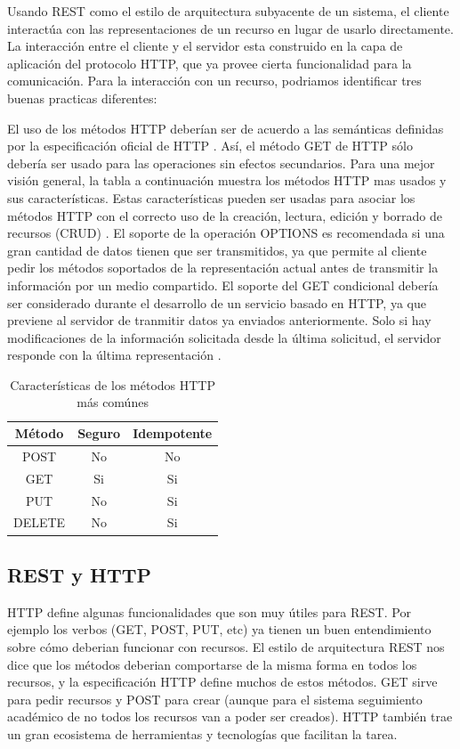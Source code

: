 Usando REST como el estilo de arquitectura subyacente de un sistema, el cliente interactúa con las representaciones de un recurso en lugar de usarlo directamente. La interacción entre el cliente y el servidor esta construido en la capa de aplicación del protocolo HTTP, que ya provee cierta funcionalidad para la comunicación. Para la interacción con un recurso, podriamos identificar tres buenas practicas diferentes:
\begin{outline}
    \1 El uso de los métodos HTTP deberían ser de acuerdo a las semánticas definidas por la especificación oficial de HTTP \cite{WAPID}. Así, el método GET de HTTP sólo debería ser usado para las operaciones sin efectos secundarios. Para una mejor visión general, la tabla a continuación muestra los métodos HTTP mas usados y sus características. Estas características pueden ser usadas para asociar los métodos HTTP con el correcto uso de la creación, lectura, edición y borrado de recursos (CRUD) \cite{RVINOSKI}.
    \1 El soporte de la operación OPTIONS es recomendada si una gran cantidad de datos tienen que ser transmitidos, ya que permite al cliente pedir los métodos soportados de la representación actual antes de transmitir la información por un medio compartido. 
    \1 El soporte del GET condicional debería ser considerado durante el desarrollo de un servicio basado en HTTP, ya que previene al servidor de tranmitir datos ya enviados anteriormente. Solo si hay modificaciones de la información solicitada desde la última solicitud, el servidor responde con la última representación  \cite{RVINOSKI}.
\end{outline}

\begin{table}[!htbp]
    \centering
    \makegapedcells
    \begin{tabular}{|c|c|c|}
    \hline
    Método & Seguro & Idempotente \\ \hline
    POST & No & No \\ \hline
    GET & Si & Si \\ \hline
    PUT & No & Si \\ \hline
    DELETE & No & Si \\ \hline
    
    \end{tabular}
    \caption{Características de los métodos HTTP más comúnes}
    \label{tab:tabla_planes}
\end{table}

\subsection[REST y HTTP]{REST y HTTP}
HTTP define algunas funcionalidades que son muy útiles para REST. Por ejemplo los verbos (GET, POST, PUT, etc) ya tienen un buen entendimiento sobre cómo deberian funcionar con recursos. El estilo de arquitectura REST nos dice que los métodos deberian comportarse de la misma forma en todos los recursos, y la especificación HTTP define muchos de estos métodos. 
GET sirve para pedir recursos y POST para crear (aunque para el sistema seguimiento académico de no todos los recursos van a poder ser creados).
HTTP también trae un gran ecosistema de herramientas y tecnologías que facilitan la tarea. 



